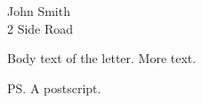 \documentclass[11pt]{article}
\date{2026-09-28}
\begin{document}

\begin{letter}{%
John Smith\\
2 Side Road}

\opening{}

Body text of the letter.
More text.
\closing{}
\vspace{2em}
\ps{A postscript.}



\end{letter}
\end{document}
